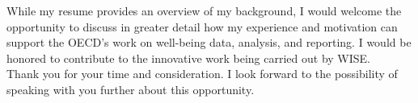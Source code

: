 \documentclass[11pt,a4paper,roman]{moderncv}
\begin{document}
\vspace{1em}
While my resume provides an overview of my background, I would welcome the opportunity to discuss in greater detail how my experience and motivation can support the OECD’s work on well-being data, analysis, and reporting. I would be honored to contribute to the innovative work being carried out by WISE.\\

\vspace{1em}
Thank you for your time and consideration. I look forward to the possibility of speaking with you further about this opportunity.

\vspace{0.5cm}


\makeletterclosing
\end{document}
